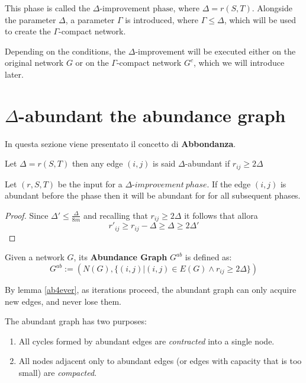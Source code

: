 This phase is called the \(\Delta\text{-improvement phase}\), where \(\Delta = r(S, T)\). Alongside the parameter \(\Delta\), a parameter \(\Gamma\) is introduced, where \(\Gamma \leq \Delta\), which will be used to create the \(\Gamma\)-compact network.

Depending on the conditions, the \(\Delta\)-improvement will be executed either on the original network \(G\) or on the \(\Gamma\)-compact network \(G^c\), which we will introduce later.
\newpage

\section{$\Delta$-abundant the abundance graph}
In questa sezione viene presentato il concetto di \textbf{Abbondanza}.

\begin{definition}
    Let $\Delta = r(S,T)$ then any edge $(i,j)$ is said $\Delta$-abundant if $r_{ij} \ge 2\Delta$ 
     
\end{definition}
\begin{lemma}
    \label{ab4ever}
    Let $(r,S,T)$ be the input for a $\Delta\text{-}improvement\ phase$. If the edge  $(i,j)$ is abundant before the phase then it will be abundant for for all subsequent phases.
\end{lemma}
\begin{proof}
    Since
    $\Delta' \le \frac{\Delta}{8m} $ and recalling that $r_{ij} \ge 2\Delta $ it follows that 
    allora \[r'_{ij} \ge r_{ij}-\Delta \ge\Delta\ge  2\Delta'\]
\end{proof}

\begin{definition}
    Given a network $G$, its \textbf{Abundance Graph} $G^{ab}$ is defined as: 
    \[G^{ab} := (N(G), \{(i,j)| (i,j)\in E(G)\land r_{ij}\ge 2\Delta\})\]
\end{definition}

\begin{obs}
    By lemma \ref{ab4ever}, as iterations proceed, the abundant graph can only acquire new edges, and never lose them.
\end{obs}

The abundant graph has two purposes: 
\begin{enumerate}
    \item All cycles formed by abundant edges are \textit{contracted} into a single node.
    \item All nodes adjacent only to abundant edges (or edges with capacity that is too small) are \textit{compacted}.
\end{enumerate}

